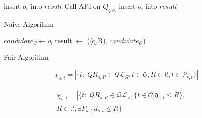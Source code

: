 \begin{algorithm}[bht]
\dontprintsemicolon
\SetVline




{
    {
      { 
	  insert $o_i$ into $result$ \;
      }
      Call \spath API on $Q_{q,o_i}$  \;
      {
	  insert $o_i$ into $result$ \; 
      }

    }
     \;
}

\caption{Naive Algorithm}
\label{alg:naive}
\end{algorithm}


\begin{algorithm}[bht]
\dontprintsemicolon
\SetVline




{
    {
      $candidate_{\mathcal{O}} \leftarrow o_i$ \;
    }
    result $\leftarrow$ \naivens((q,R), $candidate_{\mathcal{O}}$) \;

     \;
}

\caption{Fair Algorithm}
\label{alg:fair}
\end{algorithm}


\begin{align}\label{eq:chinaive}
\chi_{s,t}  = | \{ t :\;  QR_{s,R} \in \mathcal{QL_R}, t \in \mathcal{O}, R \in \mathbb{R}, t \in P_{s,t} \} |
\end{align}

\begin{align}\label{eq:chifair}
\nonumber \chi_{s,t}  = | \{ t :\;  QR_{s,R} \in \mathcal{QL_R}, \{t \in \mathcal{O} | \mathfrak{d}_{s,t} \leq R \}, & &\\
R \in \mathbb{R}, \exists P_{s,t} | d_{s,t} \leq R \} | &
\end{align}




